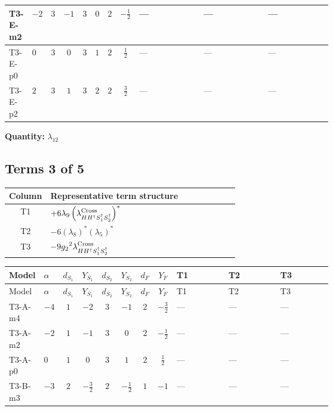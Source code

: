 \documentclass[8pt]{article}
\begin{document}
\begin{landscape}
\begin{longtable}{@{}llcccccc >{\raggedright\arraybackslash}p{0.21\linewidth} >{\raggedright\arraybackslash}p{0.21\linewidth} >{\raggedright\arraybackslash}p{0.21\linewidth}@{}}
\midrule
T3-E-m2 & $-2$ & $3$ & $-1$ & $3$ & $0$ & $2$ & $-\frac{1}{2}$ & --- & --- & --- \\
\midrule
T3-E-p0 & $0$ & $3$ & $0$ & $3$ & $1$ & $2$ & $\frac{1}{2}$ & --- & --- & --- \\
\midrule
T3-E-p2 & $2$ & $3$ & $1$ & $3$ & $2$ & $2$ & $\frac{3}{2}$ & --- & --- & --- \\
\midrule
\bottomrule
\end{longtable}
\clearpage
\noindent\textbf{Quantity: }$\lambda_{12}$\par\smallskip
\subsection*{Terms 3 of 5}
\begin{center}
\begin{tabular}{@{}c >{\raggedright\arraybackslash}p{0.82\linewidth}@{}}
\toprule
Column & Representative term structure \\
\midrule
T1 & \(\displaystyle +6 {\lambda_{9}} \left({\lambda_{H H^\dagger S_1^\dagger S_2^\dagger}^{\rm Cross}}\right)^{*}\) \\
\midrule
T2 & \(\displaystyle -6 \left({\lambda_{8}}\right)^{*} \left({\lambda_5}\right)^{*}\) \\
\midrule
T3 & \(\displaystyle -9 {g_2}^2 {\lambda_{H H^\dagger S_1^\dagger S_2^\dagger}^{\rm Cross}}\) \\
\midrule
\bottomrule
\end{tabular}
\end{center}
\smallskip
\tiny
\begin{longtable}{@{}llcccccc >{\raggedright\arraybackslash}p{0.21\linewidth} >{\raggedright\arraybackslash}p{0.21\linewidth} >{\raggedright\arraybackslash}p{0.21\linewidth}@{}}
\toprule
Model & $\alpha$ & $d_{S_1}$ & $Y_{S_1}$ & $d_{S_2}$ & $Y_{S_2}$ & $d_F$ & $Y_F$ & T1 & T2 & T3 \\
\midrule
\endfirsthead
\toprule
Model & $\alpha$ & $d_{S_1}$ & $Y_{S_1}$ & $d_{S_2}$ & $Y_{S_2}$ & $d_F$ & $Y_F$ & T1 & T2 & T3 \\
\midrule
\endhead
T3-A-m4 & $-4$ & $1$ & $-2$ & $3$ & $-1$ & $2$ & $-\frac{3}{2}$ & --- & --- & --- \\
\midrule
T3-A-m2 & $-2$ & $1$ & $-1$ & $3$ & $0$ & $2$ & $-\frac{1}{2}$ & --- & --- & --- \\
\midrule
T3-A-p0 & $0$ & $1$ & $0$ & $3$ & $1$ & $2$ & $\frac{1}{2}$ & --- & --- & --- \\
\midrule
T3-B-m3 & $-3$ & $2$ & $-\frac{3}{2}$ & $2$ & $-\frac{1}{2}$ & $1$ & $-1$ & --- & --- & --- \\

\end{longtable}
\end{landscape}
\end{document}
